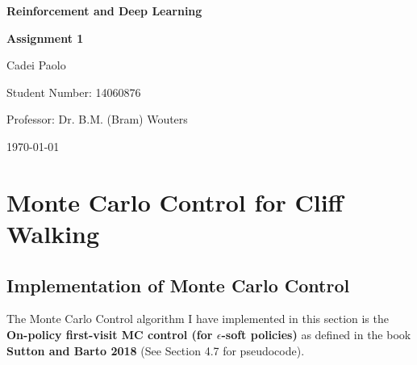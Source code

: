 \documentclass[11pt,a4paper]{article}
\begin{document}
\begin{titlepage}
    \centering
    \vspace*{\fill}
    
    {\huge\bfseries Reinforcement and Deep Learning\par}
    \vspace{0.5cm}
    {\Large\bfseries Assignment 1\par}
    \vspace{2cm}
    
    {\Large Cadei Paolo\par}
    \vspace{0.5cm}
    {\large Student Number: 14060876\par}
    \vspace{0.5cm}
    {\large Professor: Dr. B.M. (Bram) Wouters\par}
    
    \vspace{2cm}
    
    {\large \today\par}
    
    \vspace*{\fill}
    
\end{titlepage}

\section{Monte Carlo Control for Cliff Walking}

\subsection{Implementation of Monte Carlo Control}

The Monte Carlo Control algorithm I have implemented in this section is the \textbf{On-policy first-visit MC control (for $\epsilon$-soft policies)} as defined in the book \textbf{Sutton and Barto 2018} (See Section 4.7 for pseudocode).
\end{document}
